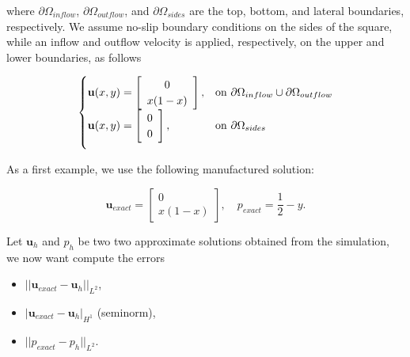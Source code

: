 \documentclass[a4paper,11pt,openright,twoside]{book}
\begin{document}
where $\partial \Omega_{inflow}$, $\partial \Omega_{outflow}$, and $\partial \Omega_{sides}$ are the top, bottom, and lateral boundaries, respectively. We assume no-slip boundary conditions on the sides of the square, while an inflow and outflow velocity is applied, respectively, on the upper and lower boundaries, as follows

\[
\begin{cases}
\mathbf{u}(x,y) = \left[ \begin{array}{c} 0 \\ x(1-x) \end{array} \right] , & \mbox{on } \partial \Omega_{inflow} \cup \partial \Omega_{outflow} \\

\vspace{.2cm}

\mathbf{u}(x,y) = \left[ \begin{array}{c} 0 \\ 0 \end{array} \right], & \mbox{on } \partial \Omega_{sides}
\end{cases}
\]



As a first example, we use the following manufactured solution:

\[
\mathbf{u}_{exact} = \left[ \begin{array}{c} 0 \\ x(1-x) \end{array} \right], \quad
p_{exact} = \frac{1}{2}-y.
\]


\begin{center}
\end{center}

Let $\mathbf{u}_h$ and $p_h$ be two two approximate solutions obtained from the simulation, we now want compute the errors

\begin{itemize}
\item $|| \mathbf{u}_{exact} - \mathbf{u}_h ||_{L^2}$,
\item $ | \mathbf{u}_{exact} - \mathbf{u}_h |_{H^1}$ (seminorm),
\item $|| p_{exact} - p_h ||_{L^2} $.
\end{itemize}
\end{document}
